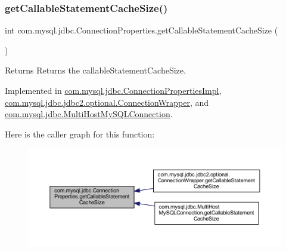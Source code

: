 \subsubsection{\texorpdfstring{get\+Callable\+Statement\+Cache\+Size()}{getCallableStatementCacheSize()}}
{\footnotesize\ttfamily int com.\+mysql.\+jdbc.\+Connection\+Properties.\+get\+Callable\+Statement\+Cache\+Size (\begin{DoxyParamCaption}{ }\end{DoxyParamCaption})}

\begin{DoxyReturn}{Returns}
Returns the callable\+Statement\+Cache\+Size. 
\end{DoxyReturn}


Implemented in \mbox{\hyperlink{classcom_1_1mysql_1_1jdbc_1_1_connection_properties_impl_a01576c2e5c6fc20cb842000b305bb087}{com.\+mysql.\+jdbc.\+Connection\+Properties\+Impl}}, \mbox{\hyperlink{classcom_1_1mysql_1_1jdbc_1_1jdbc2_1_1optional_1_1_connection_wrapper_a48786ec7533fa394062c533e06a8cce7}{com.\+mysql.\+jdbc.\+jdbc2.\+optional.\+Connection\+Wrapper}}, and \mbox{\hyperlink{classcom_1_1mysql_1_1jdbc_1_1_multi_host_my_s_q_l_connection_ab0db994f2918b0c2f97e79fc57ca60a4}{com.\+mysql.\+jdbc.\+Multi\+Host\+My\+S\+Q\+L\+Connection}}.

Here is the caller graph for this function\+:\nopagebreak
\begin{figure}[H]
\begin{center}
\leavevmode
\includegraphics[width=350pt]{interfacecom_1_1mysql_1_1jdbc_1_1_connection_properties_a413ae8156c79a09e68023792a88351ac_icgraph}
\end{center}
\end{figure}
\mbox{\label{interfacecom_1_1mysql_1_1jdbc_1_1_connection_properties_a64a9d2f56ed041326aa829a7f665747a}} 
